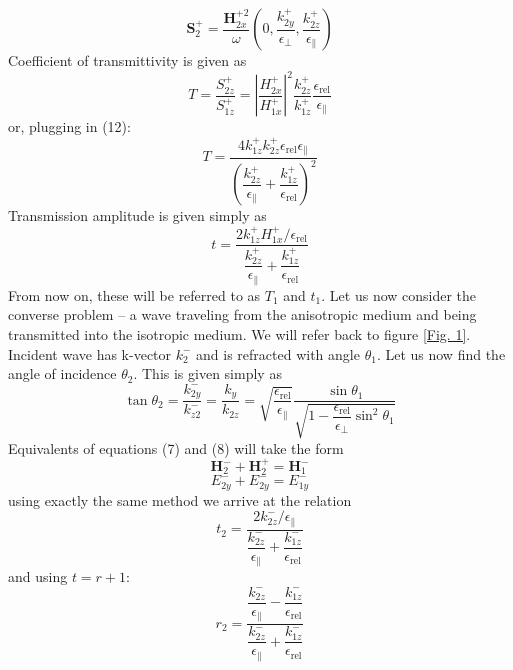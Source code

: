 \documentclass[a4paper]{scrartcl}
\begin{document}
\begin{equation}
      \mathbf{S}_2^+ = \dfrac{\mathbf{H}_{2x}^{+2}}{\omega}(0,\dfrac{k_{2y}^+}{\epsilon_\bot},
      \dfrac{k_{2z}^+}{\epsilon_\parallel})
\end{equation}
Coefficient of transmittivity is given as
\begin{equation}
      T = \dfrac{S_{2z}^+}{S_{1z}^+} = \left| \dfrac{H_{2x}^+}{H_{1x}^+} \right| ^2 \dfrac{k_{2z}^+}{k_{1z}^+}
      \dfrac{\epsilon_\textrm{rel}}{\epsilon_\parallel}
\end{equation}
or, plugging in (12):
\begin{equation}
      T = \dfrac{4 k_{1z}^+ k_{2z}^+ \epsilon_\textrm{rel} \epsilon_\parallel}{\left(
      \dfrac{k_{2z}^+}{\epsilon_\parallel} + \dfrac{k_{1z}^+}{\epsilon_\textrm{rel}} \right)^2}
\end{equation}
Transmission amplitude is given simply as
\begin{equation}
      t = \dfrac{2k_{1z}^+ H_{1x}^+ / \epsilon_\textrm{rel}}{\dfrac{k_{2z}^+}{\epsilon_\parallel} +
\dfrac{k_{1z}^+}{\epsilon_\textrm{rel} }}
\end{equation}
From now on, these will be referred to as $T_1$ and $t_1$. Let us now consider the converse problem -- a wave traveling
from the anisotropic medium and being transmitted into the isotropic medium. We will refer back to figure \ref{Fig. 1}.
Incident wave has k-vector $k_{2}^-$ and is refracted with angle $\theta_1$. Let us now find the angle of incidence
$\theta_2$. This is given simply as
\begin{equation}
      \tan \theta_2 = \dfrac{k_{2y}^-}{k_{z2}^-} = \dfrac{k_y}{k_{2z}} =
      \sqrt{\dfrac{\epsilon_\textrm{rel}}{\epsilon_\parallel}} \dfrac{\sin \theta_1}
      {\sqrt{1-\dfrac{\epsilon_\textrm{rel}}{\epsilon_\bot}\sin^2 \theta_1}}
\end{equation}
Equivalents of equations (7) and (8) will take the form
\begin{equation}
      \mathbf{H}_2^- + \mathbf{H}_2^+ = \mathbf{H}_1^-
\end{equation}
\begin{equation}
      E_{2y}^- + E_{2y}^- = E_{1y}^-
\end{equation}
using exactly the same method we arrive at the relation
\begin{equation}
      t_2 = \dfrac{2 k_{2z}^- /\epsilon_\parallel}{\dfrac{k_{2z}^-}{\epsilon_\parallel} +
      \dfrac{k_{1z}^-}{\epsilon_\textrm{rel} }}
\end{equation}
and using $t = r + 1$:
\begin{equation}
      r_2 = \dfrac{ \dfrac{k_{2z}^-}{\epsilon_\parallel} - \dfrac{k_{1z}^-}{\epsilon_\textrm{rel}} }{ \dfrac{k_{2z}^-}{\epsilon_\parallel} + \dfrac{k_{1z}^-}{\epsilon_\textrm{rel}} }
\end{equation}
\newpage
\end{document}
